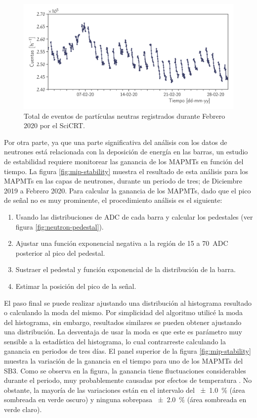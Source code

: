 \begin{figure}
        \centering
        \includegraphics[width=\textwidth]{neutron-monthly.pdf}
        \caption{Total de eventos de partículas neutras registrados durante Febrero \num{2020} por el SciCRT.}
        \label{fig:neutron-monthly}
\end{figure}

Por otra parte, ya que una parte significativa del análisis con los datos de neutrones está relacionada con la deposición de energía en las barras, un estudio de estabilidad requiere monitorear las ganancia de los MAPMTs en función del tiempo. La figura \ref{fig:mip-stability} muestra el resultado de esta análisis para los MAPMTs en las capas de neutrones, durante un periodo de tres; de Diciembre \num{2019} a Febrero \num{2020}. Para calcular la ganancia de los MAPMTs, dado que el pico de señal no es muy prominente, el procedimiento análisis es el siguiente:

\begin{enumerate}
  \item Usando las distribuciones de ADC de cada barra y calcular los pedestales (ver figura \ref{fig:neutron-pedestal}).
  \item Ajustar una función exponencial negativa a la región de \num{15} a \SI{70}{ADC} posterior al pico del pedestal.
  \item Sustraer el pedestal y función exponencial de la distribución de la barra.
  \item Estimar la posición del pico de la señal.
\end{enumerate}

El paso final se puede realizar ajustando una distribución al histograma resultado o calculando la moda del mismo. Por simplicidad del algoritmo utilicé la moda del histograma, sin embargo, resultados similares se pueden obtener ajustando una distribución. La desventaja de usar la moda es que este es parámetro muy sensible a la estadística del histograma, lo cual contrarreste calculando la ganancia en periodos de tres días. El panel superior de la figura \ref{fig:mip-stability} muestra la variación de la ganancia en el tiempo para uno de los MAPMTs del SB3. Como se observa en la figura, la ganancia tiene fluctuaciones considerables durante el periodo, muy probablemente causadas por efectos de temperatura \cite{knitta04}. No obstante, la mayoría de las variaciones están en el intervalo del \SI{\pm 1.0}{\percent} (área sombreada en verde oscuro) y ninguna sobrepasa \SI{\pm 2.0}{\percent} (área sombreada en verde claro).

